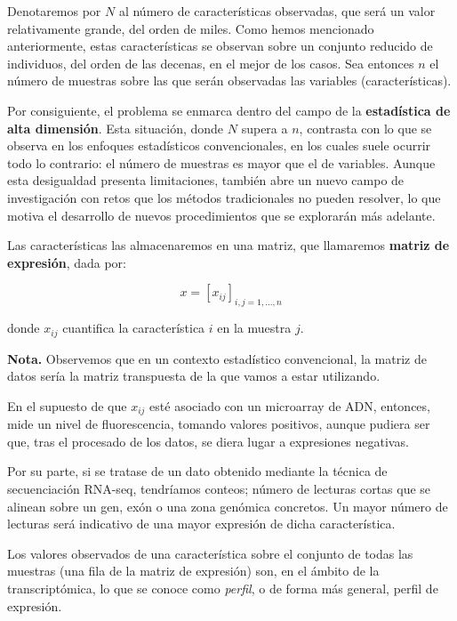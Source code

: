 Denotaremos por $N$ al número de características observadas, que será un valor relativamente grande, del orden
de miles. Como hemos mencionado anteriormente, estas características se observan sobre un conjunto reducido de 
individuos, del orden de las decenas, en el mejor de los casos. Sea entonces $n$ el número de muestras sobre
las que serán observadas las variables (características). \newline

Por consiguiente, el problema se enmarca dentro del campo de la \textbf{estadística de alta dimensión}. Esta
situación, donde $N$ supera a $n$, contrasta con lo que se observa en los enfoques estadísticos convencionales,
en los cuales suele ocurrir todo lo contrario: el número de muestras es mayor que el de variables. Aunque esta
desigualdad presenta limitaciones, también abre un nuevo campo de investigación con retos que los métodos 
tradicionales no pueden resolver, lo que motiva el desarrollo de nuevos procedimientos que se explorarán más 
adelante. \newline

Las características las almacenaremos en una matriz, que llamaremos \textbf{matriz de expresión}, dada por:

\[
    x = [x_{ij}]_{i,j=1,...,n}
\]

donde $x_{ij}$ cuantifica la característica $i$ en la muestra $j$. \newline

\textbf{Nota.} Observemos que en un contexto estadístico
convencional, la matriz de datos sería la matriz transpuesta de la que vamos a estar utilizando. \newline

En el supuesto de que $x_{ij}$ esté asociado con un microarray de ADN, entonces, mide un nivel de fluorescencia,
tomando valores positivos, aunque pudiera ser que, tras el procesado de los datos, se diera lugar a expresiones 
negativas.

Por su parte, si se tratase de un dato obtenido mediante la técnica de secuenciación RNA-seq, tendríamos conteos; 
número de lecturas cortas que se alinean sobre un gen, exón o una zona genómica concretos. Un mayor número de
lecturas será indicativo de una mayor expresión de dicha característica. \newline

Los valores observados de una característica sobre el conjunto de todas las muestras (una fila de la matriz de
expresión) son, en el ámbito de la transcriptómica, lo que se conoce como \textit{perfil}, o de forma más general,
perfil de expresión. \newline

